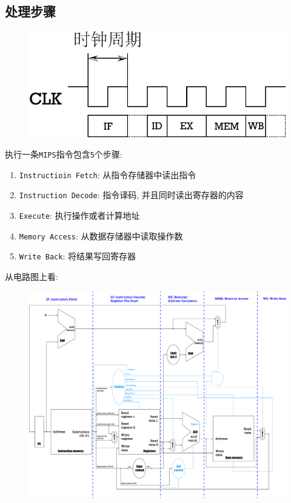 \subsection{处理步骤}
\begin{figure}[H]
\centering
\includegraphics[scale=.5]{img/figure37.pdf}
\end{figure}
执行一条\verb|MIPS|指令包含\verb|5|个步骤:
\begin{enumerate}
\item \verb|Instructioin Fetch|: 从指令存储器中读出指令
\item \verb|Instruction Decode|: 指令译码, 并且同时读出寄存器的内容
\item \verb|Execute|: 执行操作或者计算地址
\item \verb|Memory Access|: 从数据存储器中读取操作数
\item \verb|Write Back|: 将结果写回寄存器
\end{enumerate}
从电路图上看:
\begin{figure}[H]
\centering
\includegraphics[scale=.2]{img/figure36.pdf}
\end{figure}
